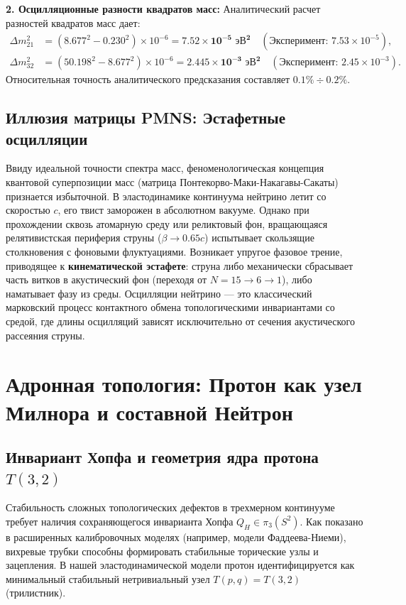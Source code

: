 \documentclass[11pt,a4paper]{article}
\begin{document}
\textbf{2. Осцилляционные разности квадратов масс:}
Аналитический расчет разностей квадратов масс дает:
\begin{align}
	\Delta m^2_{21} &= (8.677^2 - 0.230^2) \times 10^{-6} = \mathbf{7.52 \times 10^{-5} \text{ эВ}^2} \quad (\text{Эксперимент: } 7.53 \times 10^{-5}), \\
	\Delta m^2_{32} &= (50.198^2 - 8.677^2) \times 10^{-6} = \mathbf{2.445 \times 10^{-3} \text{ эВ}^2} \quad (\text{Эксперимент: } 2.45 \times 10^{-3}).
\end{align}
Относительная точность аналитического предсказания составляет $0.1\% \div 0.2\%$.

\subsection{Иллюзия матрицы PMNS: Эстафетные осцилляции}
Ввиду идеальной точности спектра масс, феноменологическая концепция квантовой суперпозиции масс (матрица Понтекорво-Маки-Накагавы-Сакаты) признается избыточной. В эластодинамике континуума нейтрино летит со скоростью $c$, его твист заморожен в абсолютном вакууме. 
Однако при прохождении сквозь атомарную среду или реликтовый фон, вращающаяся релятивистская периферия струны ($\beta \to 0.65c$) испытывает скользящие столкновения с фоновыми флуктуациями. Возникает упругое фазовое трение, приводящее к \textbf{кинематической эстафете}: струна либо механически сбрасывает часть витков в акустический фон (переходя от $N=15 \to 6 \to 1$), либо наматывает фазу из среды. 
Осцилляции нейтрино — это классический марковский процесс контактного обмена топологическими инвариантами со средой, где длины осцилляций зависят исключительно от сечения акустического рассеяния струны.

\section{Адронная топология: Протон как узел Милнора и составной Нейтрон}

\subsection{Инвариант Хопфа и геометрия ядра протона $T(3,2)$}
Стабильность сложных топологических дефектов в трехмерном континууме требует наличия сохраняющегося инварианта Хопфа $Q_H \in \pi_3(S^2)$. Как показано в расширенных калибровочных моделях (например, модели Фаддеева-Ниеми), вихревые трубки способны формировать стабильные торические узлы и зацепления.
В нашей эластодинамической модели протон идентифицируется как минимальный стабильный нетривиальный узел $T(p,q) = T(3,2)$ (трилистник). 
\end{document}
